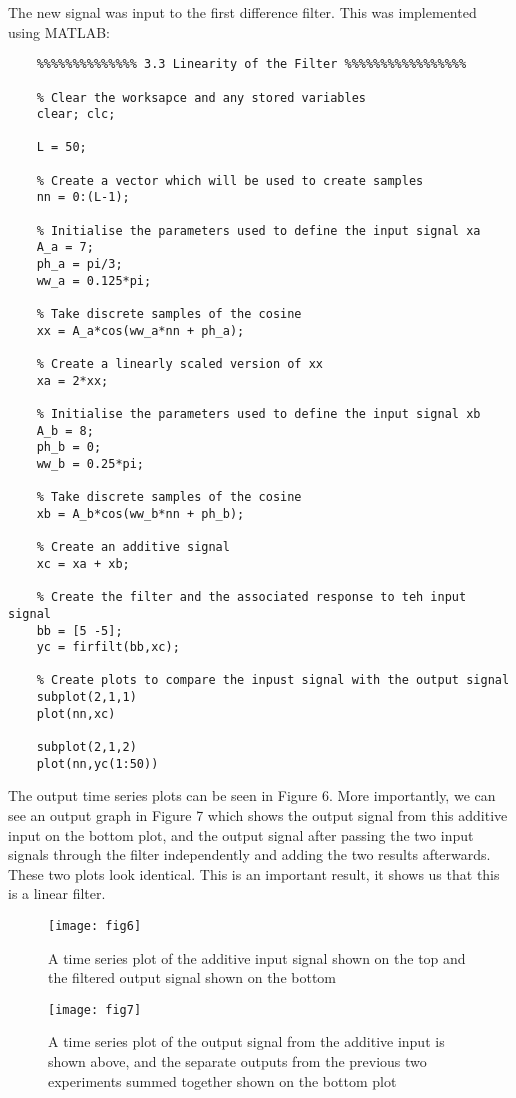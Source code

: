 \documentclass{article}
\begin{document}
The new signal was input to the first difference filter. This was implemented using MATLAB:
\begin{lstlisting}
	%%%%%%%%%%%%%% 3.3 Linearity of the Filter %%%%%%%%%%%%%%%%%
	
	% Clear the worksapce and any stored variables
	clear; clc;
	
	L = 50;
	
	% Create a vector which will be used to create samples
	nn = 0:(L-1);
	
	% Initialise the parameters used to define the input signal xa
	A_a = 7;
	ph_a = pi/3;
	ww_a = 0.125*pi;
	
	% Take discrete samples of the cosine
	xx = A_a*cos(ww_a*nn + ph_a);
	
	% Create a linearly scaled version of xx
	xa = 2*xx;
	
	% Initialise the parameters used to define the input signal xb
	A_b = 8;
	ph_b = 0;
	ww_b = 0.25*pi;
	
	% Take discrete samples of the cosine
	xb = A_b*cos(ww_b*nn + ph_b);
	
	% Create an additive signal
	xc = xa + xb;
	
	% Create the filter and the associated response to teh input signal
	bb = [5 -5];
	yc = firfilt(bb,xc);
	
	% Create plots to compare the inpust signal with the output signal
	subplot(2,1,1)
	plot(nn,xc)
	
	subplot(2,1,2)
	plot(nn,yc(1:50))
\end{lstlisting}

The output time series plots can be seen in Figure 6. More importantly, we can see an output graph in Figure 7 which shows the output signal from this additive input on the bottom plot, and the output signal after passing the two input signals through the filter independently and adding the two results afterwards. These two plots look identical. This is an important result, it shows us that this is a linear filter.

\begin{figure}[H]
	\centering
	\begin{minipage}[t]{0.4\linewidth}
		\texttt{[image: fig6]}
		\caption{A time series plot of the additive input signal shown on the top and the filtered output signal shown on the bottom}
	\end{minipage}
	\hspace{2cm}
	\begin{minipage}[t]{0.4\linewidth}
		\texttt{[image: fig7]}
		\caption{A time series plot of the output signal from the additive input is shown above, and the separate outputs from the previous two experiments summed together shown on the bottom plot}
	\end{minipage}
\end{figure}
\end{document}
